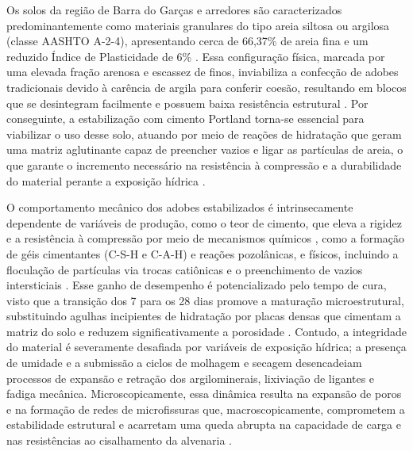 
    Os solos da região de Barra do Garças e arredores são caracterizados predominantemente como materiais granulares do tipo areia siltosa ou argilosa (classe AASHTO A-2-4), apresentando cerca de 66,37\% de areia fina e um reduzido Índice de Plasticidade de 6\%  \cite{Barroso2019, Barroso2023, Santos2018, Silva2019}. Essa configuração física, marcada por uma elevada fração arenosa e escassez de finos, inviabiliza a confecção de adobes tradicionais devido à carência de argila para conferir coesão, resultando em blocos que se desintegram facilmente e possuem baixa resistência estrutural \cite{Junior2021, Silva2019}. Por conseguinte, a estabilização com cimento Portland torna-se essencial para viabilizar o uso desse solo, atuando por meio de reações de hidratação que geram uma matriz aglutinante capaz de preencher vazios e ligar as partículas de areia, o que garante o incremento necessário na resistência à compressão e a durabilidade do material perante a exposição hídrica \cite{Novato2019, Silva2019}.


    O comportamento mecânico dos adobes estabilizados é intrinsecamente dependente de variáveis de produção, como o teor de cimento, que eleva a rigidez e a resistência à compressão por meio de mecanismos químicos \cite{Roshan2022, Zhang2025, Santos2018, Aqtash2021}, como a formação de géis cimentantes (C-S-H e C-A-H) e reações pozolânicas, e físicos, incluindo a floculação de partículas via trocas catiônicas e o preenchimento de vazios intersticiais \cite{Zhang2025, Ding2021, Messis2022}. Esse ganho de desempenho é potencializado pelo tempo de cura, visto que a transição dos 7 para os 28 dias promove a maturação microestrutural, substituindo agulhas incipientes de hidratação por placas densas que cimentam a matriz do solo e reduzem significativamente a porosidade \cite{Yang2024, Hwang2022}. Contudo, a integridade do material é severamente desafiada por variáveis de exposição hídrica; a presença de umidade e a submissão a ciclos de molhagem e secagem desencadeiam processos de expansão e retração dos argilominerais, lixiviação de ligantes e fadiga mecânica. Microscopicamente, essa dinâmica resulta na expansão de poros e na formação de redes de microfissuras que, macroscopicamente, comprometem a estabilidade estrutural e acarretam uma queda abrupta na capacidade de carga e nas resistências ao cisalhamento da alvenaria \cite{Liu2023, Chen2024}.


